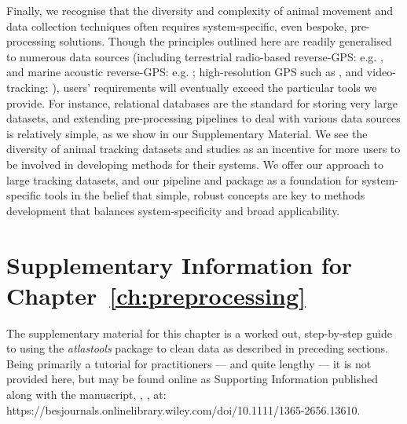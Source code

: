 Finally, we recognise that the diversity and complexity of animal movement and data collection techniques often requires system-specific, even bespoke, pre-processing solutions.
Though the principles outlined here are readily generalised to numerous data sources (including terrestrial radio-based reverse-GPS: e.g. \citealt{toledo2020}, and marine acoustic reverse-GPS: e.g. \citealt{aspillaga2021}; high-resolution GPS such as \citealt{strandburg-peshkin2015}, and video-tracking: \citealt{rathore2020}), users' requirements will eventually exceed the particular tools we provide.
For instance, relational databases are the standard for storing very large datasets, and extending pre-processing pipelines to deal with various data sources is relatively simple, as we show in our Supplementary Material.
We see the diversity of animal tracking datasets and studies as an incentive for more users to be involved in developing methods for their systems.
We offer our approach to large tracking datasets, and our pipeline and package as a foundation for system-specific tools in the belief that simple, robust concepts are key to methods development that balances system-specificity and broad applicability.

{ \begin{center}  \end{center} }


\newpage

\begingroup

\let\clearpage\relax
\let\cleardoublepage\relax
\let\cleardoublepage\relax

{\chapter*{Supplementary Information for Chapter~\ref{ch:preprocessing}}}

The supplementary material for this chapter is a worked out, step-by-step guide to using the \emph{atlastools} package to clean data as described in preceding sections.
Being primarily a tutorial for practitioners --- and quite lengthy --- it is not provided here, but may be found online as Supporting Information published along with the manuscript, \textcite{gupte2022d}, , at:
https://besjournals.onlinelibrary.wiley.com/doi/10.1111/1365-2656.13610.

{ \begin{center}  \end{center} }

\endgroup

